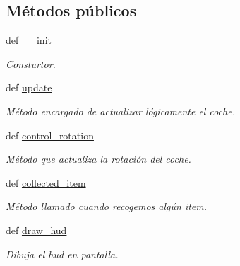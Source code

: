 \subsection*{\-Métodos públicos}
\begin{DoxyCompactItemize}
\item 
def \hyperlink{classengine_1_1playercar_1_1PlayerCar_a029d75f1a6f45516f98aea91e50e9c7c}{\-\_\-\-\_\-init\-\_\-\-\_\-}
\begin{DoxyCompactList}\small\item\em \-Consturtor. \end{DoxyCompactList}\item 
\hypertarget{classengine_1_1playercar_1_1PlayerCar_a482d859761f301023646ab17c18c3c85}{
def \hyperlink{classengine_1_1playercar_1_1PlayerCar_a482d859761f301023646ab17c18c3c85}{update}}
\label{classengine_1_1playercar_1_1PlayerCar_a482d859761f301023646ab17c18c3c85}

\begin{DoxyCompactList}\small\item\em \-Método encargado de actualizar lógicamente el coche. \end{DoxyCompactList}\item 
\hypertarget{classengine_1_1playercar_1_1PlayerCar_a73f028c1c4c091bf20d1beecfab7cf64}{
def \hyperlink{classengine_1_1playercar_1_1PlayerCar_a73f028c1c4c091bf20d1beecfab7cf64}{control\-\_\-rotation}}
\label{classengine_1_1playercar_1_1PlayerCar_a73f028c1c4c091bf20d1beecfab7cf64}

\begin{DoxyCompactList}\small\item\em \-Método que actualiza la rotación del coche. \end{DoxyCompactList}\item 
\hypertarget{classengine_1_1playercar_1_1PlayerCar_ac34f3f2971ecb1a07c81f1b09543af1c}{
def \hyperlink{classengine_1_1playercar_1_1PlayerCar_ac34f3f2971ecb1a07c81f1b09543af1c}{collected\-\_\-item}}
\label{classengine_1_1playercar_1_1PlayerCar_ac34f3f2971ecb1a07c81f1b09543af1c}

\begin{DoxyCompactList}\small\item\em \-Método llamado cuando recogemos algún item. \end{DoxyCompactList}\item 
def \hyperlink{classengine_1_1playercar_1_1PlayerCar_a4f7f8281da118e16e46fd73ef3256915}{draw\-\_\-hud}
\begin{DoxyCompactList}\small\item\em \-Dibuja el hud en pantalla. \end{DoxyCompactList}\end{DoxyCompactItemize}
